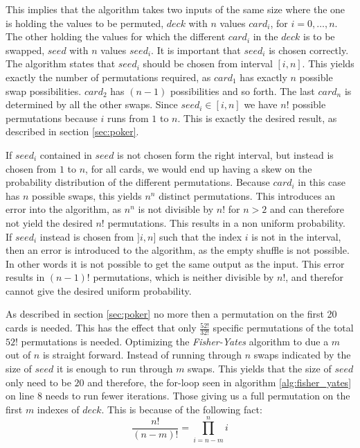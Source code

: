 \documentclass[twoside,11pt,openright]{report}
\newcommand{\FY}{\textit{Fisher-Yates} }
\begin{document}
This implies that the algorithm takes two inputs of the same size where the one is holding the values to be permuted, $deck$ with $n$ values $card_i$, for $i=0,\dots,n$. The other holding the values for which the different $card_i$ in the $deck$ is to be swapped, $seed$ with $n$ values $seed_i$. It is important that $seed_i$ is chosen correctly. The algorithm states that $seed_i$ should be chosen from interval $[i,n]$. This yields exactly the number of permutations required, as $card_1$ has exactly $n$ possible swap possibilities. $card_2$ has $(n-1)$ possibilities and so forth. The last $card_n$ is determined by all the other swaps. Since $seed_i\in[i,n]$ we have $n!$ possible permutations because $i$ runs from $1$ to $n$. This is exactly the desired result, as described in section \ref{sec:poker}.

If $seed_i$ contained in $seed$ is not chosen form the right interval, but instead is chosen from $1$ to $n$, for all cards, we would end up having a skew on the probability distribution of the different permutations. Because $card_i$ in this case has $n$ possible swaps, this yields $n^n$ distinct permutations. This introduces an error into the algorithm, as $n^n$ is not divisible by $n!$ for $n>2$ and can therefore not yield the desired $n!$ permutations. This results in a non uniform probability. If $seed_i$ instead is chosen from $]i,n]$ such that the index $i$ is not in the interval, then an error is introduced to the algorithm, as the empty shuffle is not possible. In other words it is not possible to get the same output as the input. This error results in $(n-1)!$ permutations, which is neither divisible by $n!$, and therefor cannot give the desired uniform probability.

\bigskip

As described in section \ref{sec:poker} no more then a permutation on the first 20 cards is needed. This has the effect that only $\frac{52!}{32!}$ specific permutations of the total $52!$ permutations is needed. Optimizing the \FY algorithm to due a $m$ out of $n$ is straight forward. Instead of running through $n$ swaps indicated by the size of $seed$ it is enough to run through $m$ swaps. This yields that the size of $seed$ only need to be $20$ and therefore, the for-loop seen in algorithm \ref{alg:fisher_yates} on line $8$ needs to run fewer iterations. Those giving us a full permutation on the first $m$ indexes of $deck$. This is because of the following fact: $$\frac{n!}{(n-m)!} = \prod_{i=n-m}^n i$$

\bigskip
\end{document}
